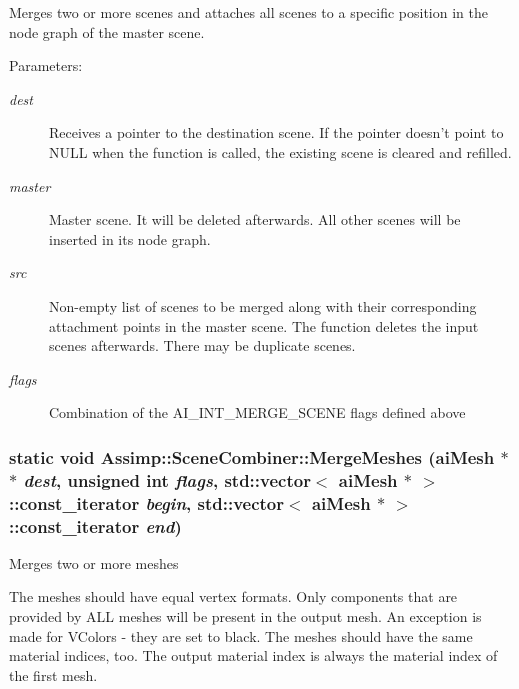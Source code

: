 Merges two or more scenes and attaches all scenes to a specific position in the node graph of the master scene.

\begin{Desc}
\item[Parameters:]
\begin{description}
\item[{\em dest}]Receives a pointer to the destination scene. If the pointer doesn't point to NULL when the function is called, the existing scene is cleared and refilled. \item[{\em master}]Master scene. It will be deleted afterwards. All other scenes will be inserted in its node graph. \item[{\em src}]Non-empty list of scenes to be merged along with their corresponding attachment points in the master scene. The function deletes the input scenes afterwards. There may be duplicate scenes. \item[{\em flags}]Combination of the AI\_\-INT\_\-MERGE\_\-SCENE flags defined above \end{description}
\end{Desc}
\hypertarget{class_assimp_1_1_scene_combiner_3486044d9e2213bb8c408d8e8ef906f4}{
\subsubsection[MergeMeshes]{\setlength{\rightskip}{0pt plus 5cm}static void Assimp::SceneCombiner::MergeMeshes ({\bf aiMesh} $\ast$$\ast$ {\em dest}, \/  unsigned int {\em flags}, \/  std::vector$<$ {\bf aiMesh} $\ast$ $>$::const\_\-iterator {\em begin}, \/  std::vector$<$ {\bf aiMesh} $\ast$ $>$::const\_\-iterator {\em end})}}
\label{class_assimp_1_1_scene_combiner_3486044d9e2213bb8c408d8e8ef906f4}


Merges two or more meshes

The meshes should have equal vertex formats. Only components that are provided by ALL meshes will be present in the output mesh. An exception is made for VColors - they are set to black. The meshes should have the same material indices, too. The output material index is always the material index of the first mesh.

